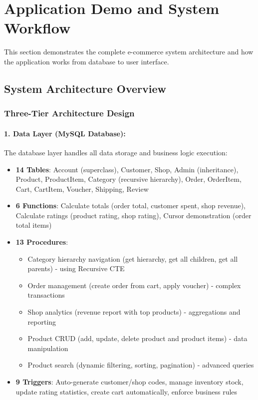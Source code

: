 \section{Application Demo and System Workflow}

This section demonstrates the complete e-commerce system architecture and how the application works from database to user interface.

\subsection{System Architecture Overview}

\subsubsection{Three-Tier Architecture Design}

\paragraph{1. Data Layer (MySQL Database):}

The database layer handles all data storage and business logic execution:

\begin{itemize}
    \item \textbf{14 Tables}: Account (superclass), Customer, Shop, Admin (inheritance), Product, ProductItem, Category (recursive hierarchy), Order, OrderItem, Cart, CartItem, Voucher, Shipping, Review
    \item \textbf{6 Functions}: Calculate totals (order total, customer spent, shop revenue), Calculate ratings (product rating, shop rating), Cursor demonstration (order total items)
    \item \textbf{13 Procedures}: 
    \begin{itemize}
        \item Category hierarchy navigation (get hierarchy, get all children, get all parents) - using Recursive CTE
        \item Order management (create order from cart, apply voucher) - complex transactions
        \item Shop analytics (revenue report with top products) - aggregations and reporting
        \item Product CRUD (add, update, delete product and product items) - data manipulation
        \item Product search (dynamic filtering, sorting, pagination) - advanced queries
    \end{itemize}
    \item \textbf{9 Triggers}: Auto-generate customer/shop codes, manage inventory stock, update rating statistics, create cart automatically, enforce business rules
\end{itemize}

